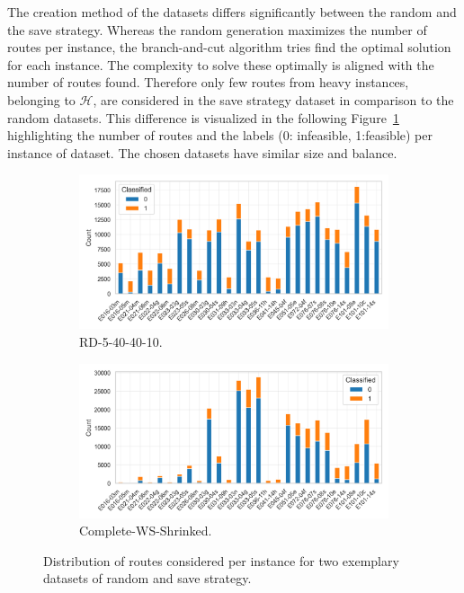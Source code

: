 The creation method of the datasets differs significantly between the random and the save strategy. Whereas the random
generation maximizes the number of routes per instance, the branch-and-cut algorithm tries
find the optimal solution for each instance. The complexity to solve these optimally is aligned with the number of routes found.
Therefore only few routes from heavy instances, belonging to $\mathcal{H}$, are considered in the save strategy dataset
in comparison to the random datasets. This difference is visualized in the following Figure~\ref{fig:comparison_noroutes_perInstancce}
highlighting the number of routes and the labels (0: infeasible, 1:feasible) per instance of \gendreauDataSet dataset. The chosen
datasets have similar size and balance.

\begin{figure}[ht]
	\centering
	\begin{subfigure}[t]{.5\textwidth}
		\centering
		\includegraphics[width=\linewidth]{pictures/dataset_structure/distribution_plot_RandomData_5_40_40_10.png}
		\caption{RD-5-40-40-10.}
	\end{subfigure}%
	\begin{subfigure}[t]{.5\textwidth}
		\centering
		\includegraphics[width=\linewidth]{pictures/dataset_structure/distribution_plot_gendreau_28880_600_WS_shrinked094.png}
		\caption{Complete-WS-Shrinked.}
	\end{subfigure}
	\caption[Distribution of routes considered per instance for two exemplary datasets of random and save strategy.]
	{Distribution of routes considered per instance for two exemplary datasets of random and save strategy.}
	\label{fig:comparison_noroutes_perInstancce}
\end{figure}

